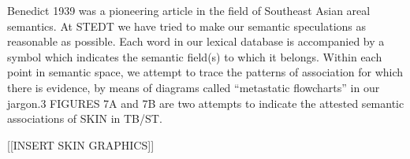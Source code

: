 Benedict 1939 was a pioneering article in the field of Southeast Asian areal semantics. At STEDT we have tried to make our semantic speculations as reasonable as possible. Each word in our lexical database is accompanied by a symbol which indicates the semantic field(s) to which it belongs. Within each point in semantic space, we attempt to trace the patterns of association for which there is evidence, by means of diagrams called “metastatic flowcharts” in our jargon.3 FIGURES 7A and 7B are two attempts to indicate the attested semantic associations of SKIN in TB/ST.

[[INSERT SKIN GRAPHICS]]
